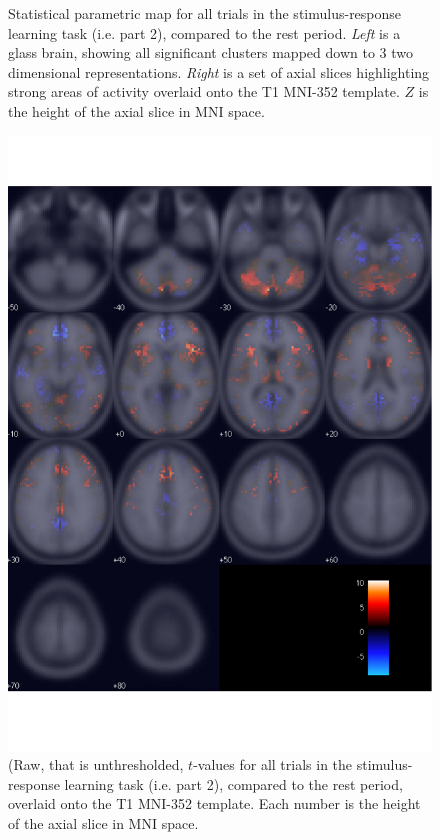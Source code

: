 \documentclass[doc,12pt]{apa}        %
\begin{document}
\begin{figure}[tp]
    \centering
    \caption{Statistical parametric map for all trials in the stimulus-response learning task (i.e. part 2), compared to the rest period.  \emph{Left} is a glass brain, showing all significant clusters mapped down to 3 two dimensional representations.  \emph{Right} is a set of axial slices highlighting strong areas of activity overlaid onto the T1 MNI-352 template.  $Z$ is the height of the axial slice in MNI space.}
	\label{fig:gl}
\end{figure}

\begin{figure}[tp]
	\includegraphics{f_map_gl_raw_t}
    \centering
	\caption{(Raw, that is unthresholded, $t$-values for all trials in the stimulus-response learning task (i.e. part 2), compared to the rest period,  overlaid onto the T1 MNI-352 template.   Each number is the height of the axial slice in MNI space.}
	\label{fig:glraw}
\end{figure}
\end{document}
